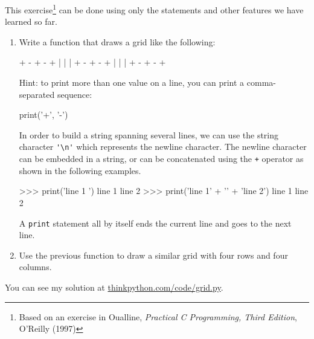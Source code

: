 \begin{exercise}
This exercise\footnote{Based on an exercise in Oualline, {\em
    Practical C Programming, Third Edition}, O'Reilly (1997)} can be
done using only the statements and other features we have learned so
far.  


\begin{enumerate}

\item Write a function that draws a grid like the
  following:

\beforeverb
\begin{pyexo}
+ - + - +
|   |   |
+ - + - +
|   |   |
+ - + - +
\end{pyexo}
\afterverb
%
Hint: to print more than one value on a line, you can print
a comma-separated sequence:

\beforeverb
\begin{pyexo}
print('+', '-')
\end{pyexo}
\afterverb
%
In order to build a string spanning several lines, we can use the string character \verb|'\n'| which represents the newline character. The newline character can be embedded in a string, or can be concatenated using the {\tt +} operator as shown in the following examples.

\beforeverb
\begin{pyexo}
>>> print('line 1 ')
line 1 
line 2
>>> print('line 1' + '\n' + 'line 2')
line 1
line 2
\end{pyexo}
\afterverb
%
A {\tt print} statement all by itself ends the current line and
goes to the next line.

\item Use the previous function to draw a similar grid
with four rows and four columns.

\end{enumerate}

{\color{red} You can see my solution at \url{thinkpython.com/code/grid.py}.}

\end{exercise}



